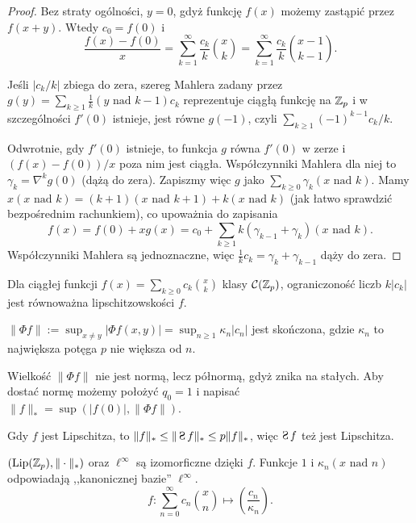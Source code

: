 \begin{proof}
Bez straty ogólności, $y = 0$, gdyż funkcję $f(x)$ możemy zastąpić przez $f(x+y)$.
Wtedy $c_0 = f(0)$ i 
\[
	\frac{f(x) - f(0)}{x} = \sum_{k=1}^\infty \frac{c_k}{k} {x \choose k} = \sum_{k=1}^\infty \frac{c_k}{k} {x-1 \choose k-1}.
\]

Jeśli $|c_k/k|$ zbiega do zera, szereg Mahlera zadany przez $g(y) = \sum_{k \ge 1} \frac {1}k (y \mbox{ nad } k-1) c_k $ reprezentuje ciągłą funkcję na $\mathbb Z_p$ i w szczególności $f'(0)$ istnieje, jest równe $g(-1)$, czyli $\sum_{k \ge 1} (-1)^{k-1} {c_k}/{k}$.

Odwrotnie, gdy $f'(0)$ istnieje, to funkcja $g$ równa $f'(0)$ w zerze i $(f(x) - f(0)) / x$ poza nim jest ciągła.
Współczynniki Mahlera dla niej to $\gamma_k = \nabla^k g(0)$ (dążą do zera).
Zapiszmy więc $g$ jako $\sum_{k \ge 0} \gamma_k (x \mbox{ nad } k)$.
Mamy $x (x \mbox{ nad } k) = (k+1) (x \mbox{ nad } k+1) + k (x \mbox{ nad } k)$ (jak łatwo sprawdzić bezpośrednim rachunkiem), co upoważnia do zapisania
\[
	f(x) = f(0) + x g(x) = c_0 + \sum_{k \ge 1} k (\gamma_{k-1} + \gamma_k) (x \mbox{ nad } k).
\]
Współczynniki Mahlera są jednoznaczne, więc $\frac 1k c_k = \gamma_k + \gamma_{k-1}$ dąży do zera.
\end{proof}

\begin{fakt}
	Dla ciągłej funkcji $f(x) = \sum_{k \ge 0} c_k{x \choose k}$ klasy $\mathcal C(\mathbb Z_p)$, ograniczoność liczb $k|c_k|$ jest równoważna lipschitzowskości $f$.
\end{fakt}

\begin{wniosek}
	$\|\Phi f\| := \sup_{x \neq y} |\Phi f(x,y)| = \sup_{n \ge 1} \kappa_n |c_n|$ jest skończona, gdzie $\kappa_n$ to największa potęga $p$ nie większa od $n$.
\end{wniosek}

Wielkość $\|\Phi f\|$ nie jest normą, lecz półnormą, gdyż znika na stałych.
Aby dostać normę możemy położyć $q_0 = 1$ i napisać $\|f\|_* = \sup(|f(0)|, \|\Phi f\|)$.

\begin{wniosek}
	Gdy $f$ jest Lipschitza, to $\|f\|_* \le \|\suma f\|_* \le p \|f\|_*$, więc $\suma f$ też jest Lipschitza.
\end{wniosek}

\begin{wniosek}
	$(\textrm{Lip}(\mathbb Z_p), \|\cdot\|_*)$ oraz $\ell^\infty$ są izomorficzne dzięki $f$.
	Funkcje $1$ i $\kappa_n(x\textrm{ nad }n)$ odpowiadają ,,kanonicznej bazie'' $\ell^\infty$.
	\[
		f \colon \sum_{n=0}^\infty c_n {x \choose n} \mapsto \left( \frac{c_n}{\kappa_n}\right).
	\]
\end{wniosek}


